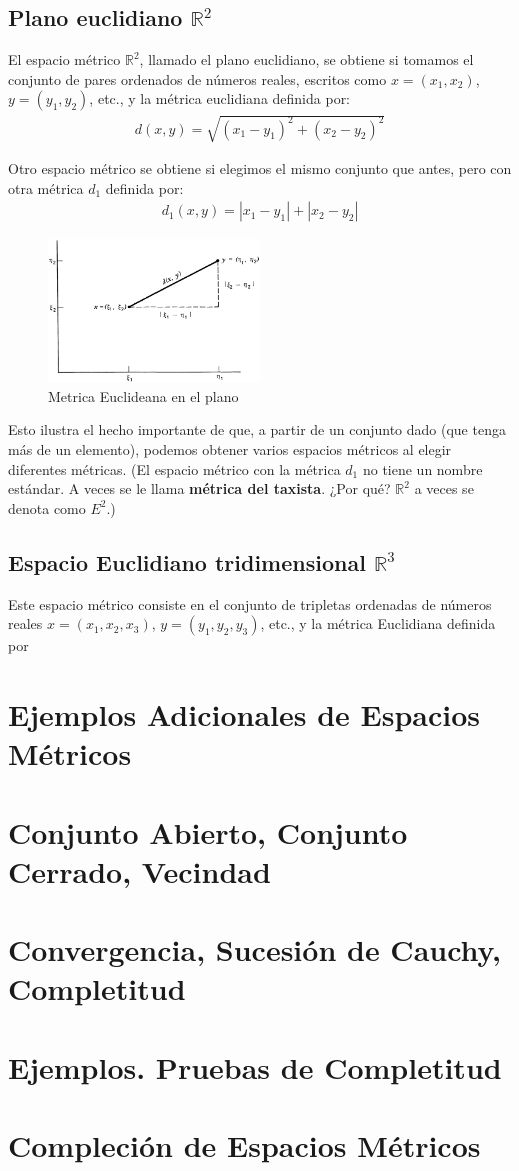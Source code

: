 {\subsection{Plano euclidiano \texorpdfstring{$\mathbb{R}^2$}{R} }
El espacio métrico \(\mathbb{R}^2\), llamado el plano euclidiano, se obtiene si tomamos el conjunto de pares ordenados de números reales, escritos como \(x = (x_1, x_2)\), \(y = (y_1, y_2)\), etc., y la métrica euclidiana definida por:
\begin{align}
    d(x,y)=\sqrt{(x_1-y_1)^2+(x_2-y_2)^2}
\end{align}

Otro espacio métrico se obtiene si elegimos el mismo conjunto que antes, pero con otra métrica \(d_1\) definida por:
\begin{align}
    d_1(x,y)=|x_1-y_1|+|x_2-y_2|
\end{align}
\begin{figure}[H]
    \centering
    \includegraphics[width=0.5\textwidth]{img/metricSpace/3.png}
    \caption{Metrica Euclideana en el plano}
\end{figure}
Esto ilustra el hecho importante de que, a partir de un conjunto dado (que tenga más de un elemento), podemos obtener varios espacios métricos al elegir diferentes métricas. (El espacio métrico con la métrica \(d_1\) no tiene un nombre estándar. A veces se le llama \textbf{métrica del taxista}. ¿Por qué? \(\mathbb{R}^2\) a veces se denota como \(E^2\).)

\subsection{Espacio Euclidiano tridimensional \texorpdfstring{$\mathbb{R}^3$}{R} }
Este espacio métrico consiste en el conjunto de tripletas ordenadas de números reales \(x = (x_1, x_2, x_3)\), \(y = (y_1, y_2, y_3)\), etc., y la métrica Euclidiana definida por

}






\section{Ejemplos Adicionales de Espacios Métricos} 
\section{Conjunto Abierto, Conjunto Cerrado, Vecindad}
\section{Convergencia, Sucesión de Cauchy, Completitud}
\section{Ejemplos. Pruebas de Completitud}
\section{Compleción de Espacios Métricos} 